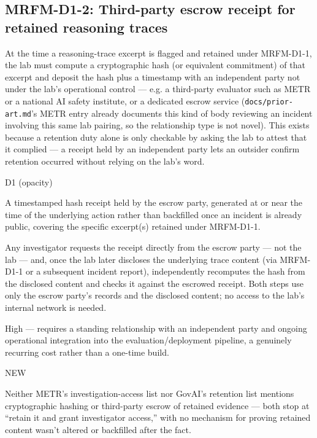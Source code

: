 \subsection*{MRFM-D1-2: Third-party escrow receipt for retained reasoning traces}
\begin{description}[leftmargin=2.2cm, style=nextline]
\item[Requirement] At the time a reasoning-trace excerpt is flagged and retained under MRFM-D1-1, the lab must compute a cryptographic hash (or equivalent commitment) of that excerpt and deposit the hash plus a timestamp with an independent party not under the lab's operational control --- e.g. a third-party evaluator such as METR or a national AI safety institute, or a dedicated escrow service (\texttt{docs/prior-art.md}'s METR entry already documents this kind of body reviewing an incident involving this same lab pairing, so the relationship type is not novel). This exists because a retention duty alone is only checkable by asking the lab to attest that it complied --- a receipt held by an independent party lets an outsider confirm retention occurred without relying on the lab's word.
\item[Degradation defended] D1 (opacity)
\item[Evidence required] A timestamped hash receipt held by the escrow party, generated at or near the time of the underlying action rather than backfilled once an incident is already public, covering the specific excerpt(s) retained under MRFM-D1-1.
\item[Verifier (no lab network access needed)] Any investigator requests the receipt directly from the escrow party --- not the lab --- and, once the lab later discloses the underlying trace content (via MRFM-D1-1 or a subsequent incident report), independently recomputes the hash from the disclosed content and checks it against the escrowed receipt. Both steps use only the escrow party's records and the disclosed content; no access to the lab's internal network is needed.
\item[Cost band] High --- requires a standing relationship with an independent party and ongoing operational integration into the evaluation/deployment pipeline, a genuinely recurring cost rather than a one-time build.
\item[vs. prior art] NEW
\item[Prior-art note] Neither METR's investigation-access list nor GovAI's retention list mentions cryptographic hashing or third-party escrow of retained evidence --- both stop at ``retain it and grant investigator access,'' with no mechanism for proving retained content wasn't altered or backfilled after the fact.
\end{description}

